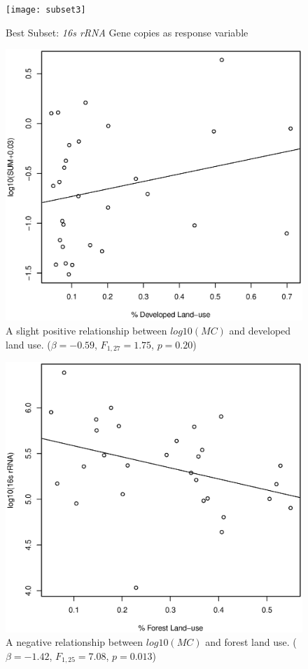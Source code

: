 \begin{figure}[!ht]
  \texttt{[image: subset3]}
  \caption{Best Subset: \emph{16s rRNA} Gene copies as response variable}
  \label{subset2}
\end{figure}




\begin{figure}
\includegraphics[width=\textwidth]{figures/developed}
\caption{A slight positive relationship between $log10(MC)$ and developed land use. ($\beta=-0.59$, $F_{{1,27}}=1.75$, $p=0.20$)}
\label{fig:developed}
\end{figure}

\begin{figure}
\includegraphics[width=\textwidth]{figures/forest}
\caption{A negative relationship between $log10(MC)$ and forest land use. ($\beta=-1.42$, $F_{{1,25}}=7.08$, $p=0.013$)}
\label{fig:forest}
\end{figure}




